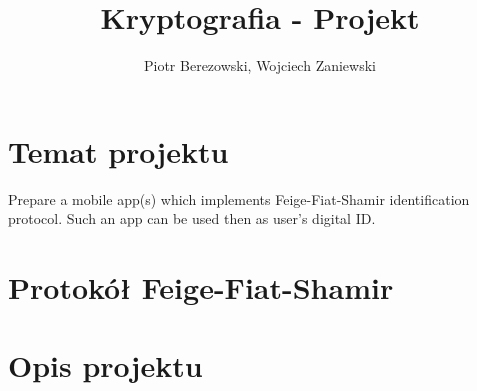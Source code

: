 \documentclass{article}
\title{Kryptografia - Projekt}
\author{Piotr Berezowski, Wojciech Zaniewski}
\begin{document}
	\maketitle
	\newpage


    \section{Temat projektu}

    Prepare a mobile app(s) which implements Feige-Fiat-Shamir identification protocol. Such an app can be used then as user's digital ID.
    
    \section{Protokół Feige-Fiat-Shamir}


    \section{Opis projektu}

    
\end{document}
